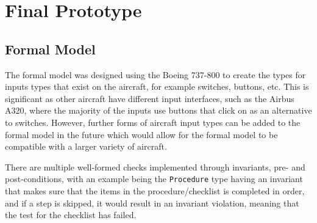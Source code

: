 \documentclass[../dissertation.tex]{subfiles}
\begin{document}
\section{Final Prototype}
\subsection{Formal Model}

The formal model was designed using the Boeing 737-800 to create the
types for inputs types that exist on the aircraft, for example
switches, buttons, etc. This is significant as other aircraft
have different input interfaces, such as the Airbus A320, where the
majority of the inputs use buttons that click on as an alternative to switches.
However, further forms of aircraft input types can be added to the formal model
in the future which would allow for the formal model to be compatible with
a larger variety of aircraft.

There are multiple well-formed checks implemented through invariants,
pre- and post-conditions, with an example being the \lstinline|Procedure| type
having an invariant that makes sure that the items in the procedure/checklist is
completed in order, and if a step is skipped, it would result in an invariant violation,
meaning that the test for the checklist has failed.
\end{document}
